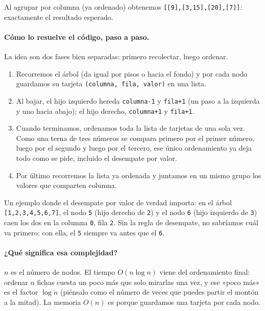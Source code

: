Al agrupar por columna (ya ordenado) obtenemos
\texttt{[[9],[3,15],[20],[7]]}: exactamente el resultado esperado.

\paragraph{Cómo lo resuelve el código, paso a paso.} La idea son dos fases bien
separadas: primero recolectar, luego ordenar.
\begin{enumerate}
  \item Recorremos el árbol (da igual por pisos o hacia el fondo) y por cada
        nodo guardamos su tarjeta \texttt{(columna, fila, valor)} en una lista.
  \item Al bajar, el hijo izquierdo hereda \texttt{columna-1} y \texttt{fila+1}
        (un paso a la izquierda y uno hacia abajo); el hijo derecho,
        \texttt{columna+1} y \texttt{fila+1}.
  \item Cuando terminamos, ordenamos toda la lista de tarjetas de una sola vez.
        Como una terna de tres números se compara primero por el primer número,
        luego por el segundo y luego por el tercero, ese único ordenamiento ya
        deja todo como se pide, incluido el desempate por valor.
  \item Por último recorremos la lista ya ordenada y juntamos en un mismo grupo
        los valores que comparten columna.
\end{enumerate}
Un ejemplo donde el desempate por valor de verdad importa: en el árbol
\texttt{[1,2,3,4,5,6,7]}, el nodo \texttt{5} (hijo derecho de \texttt{2}) y el
nodo \texttt{6} (hijo izquierdo de \texttt{3}) caen los dos en la columna
\texttt{0}, fila \texttt{2}. Sin la regla de desempate, no sabríamos cuál va
primero; con ella, el \texttt{5} siempre va antes que el \texttt{6}.




\paragraph{¿Qué significa esa complejidad?} $n$ es el número de nodos. El
tiempo $O(n \log n)$ viene del ordenamiento final: ordenar $n$ fichas cuesta un
poco más que solo mirarlas una vez, y ese «poco más» es el factor $\log n$
(piénsalo como el número de veces que puedes partir el montón a la mitad).
La memoria $O(n)$ es porque guardamos una tarjeta por cada nodo.

